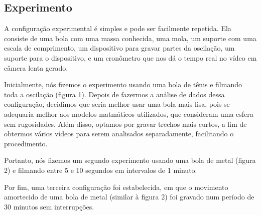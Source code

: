 \documentclass[a4paper, 12pt]{article}
\begin{document}
\begin{multicols}{2}
		\section{Experimento}
		\label{sec:experimento}
			\par A configuração experimental é simples e pode ser facilmente repetida. Ela consiste de uma bola com uma massa conhecida, uma mola, um suporte com uma escala de comprimento, um dispositivo para gravar partes da oscilação, um suporte para o dispositivo, e um cronômetro que nos dá o tempo real no vídeo em câmera lenta gerado.
			\par Inicialmente, nós fizemos o experimento usando uma bola de tênis e filmando toda a oscilação (figura 1). Depois de fazermos a análise de dados dessa configuração, decidimos que seria melhor usar uma bola mais lisa, pois se adequaria melhor aos modelos matmáticos utilizados, que consideram uma esfera sem rugosidades. Além disso, optamos por gravar trechos mais curtos, a fim de obtermos vários vídeos para serem analisados separadamente, facilitando o procedimento.
			\par Portanto, nós fizemos um segundo experimento usando uma bola de metal (figura 2) e filmando entre 5 e 10 segundos em intervalos de 1 minuto.
			\par Por fim, uma terceira configuração foi estabelecida, em que o movimento amortecido de uma bola de metal (similar à figura 2) foi gravado num período de 30 minutos sem interrupções.
			\begin{figure}[H]
				\centering

\end{figure}
\end{multicols}
\end{document}
